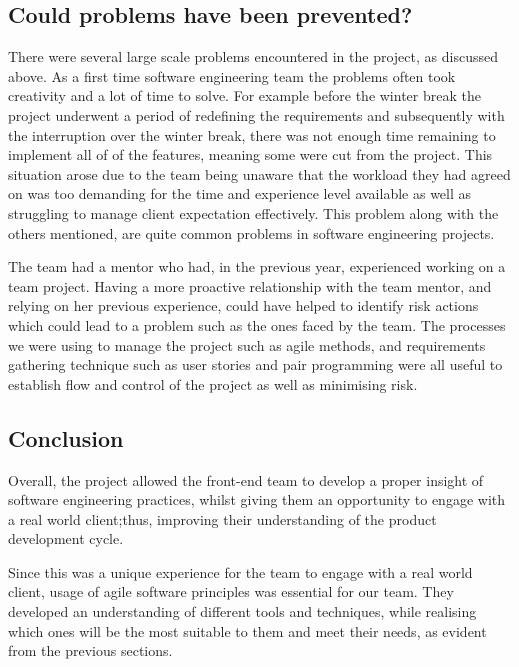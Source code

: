 \documentclass{l3proj}
\begin{document}
\subsection{Could problems have been prevented?}
There were several large scale problems encountered in the project, as discussed above. As a first time software engineering team the problems often took creativity and a lot of time to solve. For example before the winter break the project underwent a period of redefining the requirements and subsequently with the interruption over the winter break, there was not enough time remaining to implement all of of the features, meaning some were cut from the project. This situation arose due to the team being unaware that the workload they had agreed on was too demanding for the time and experience level available as well as struggling to manage client expectation effectively. This problem along with the others mentioned, are quite common problems in software engineering projects.

The team had a mentor who had, in the previous year, experienced working on a team project. Having a more proactive relationship with the team mentor, and relying on her previous experience, could have helped to identify risk actions which could lead to a problem such as the ones faced by the team. The processes we were using to manage the project such as agile methods, and requirements gathering technique such as user stories and pair programming were all useful to establish flow and control of the project as well as minimising risk.


\subsection{Conclusion }

Overall, the project allowed the front-end team to develop a proper insight of software engineering practices, whilst giving them an opportunity to engage with a real world client;thus, improving their understanding of the product development cycle.


Since this was a unique experience for the team to engage with a real world client, usage of agile software principles was essential for our team. They developed an understanding of different tools and techniques, while realising which ones will be the most suitable to them and meet their needs, as evident from the previous sections.
\end{document}
